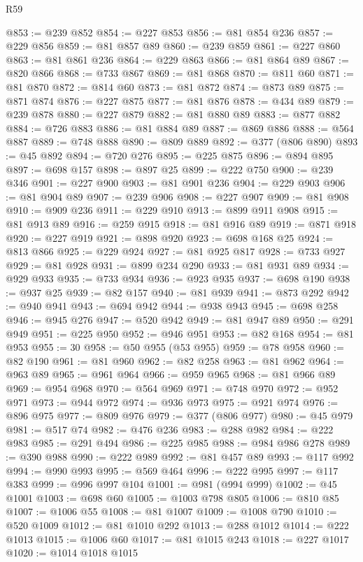 \begin{lexlean}{R59}
\begin{coremodule}
@853 := @239 @852
@854 := @227 @853
@856 := @81 @854 @236
@857 := @229 @856
@859 := @81 @857 @89
@860 := @239 @859
@861 := @227 @860
@863 := @81 @861 @236
@864 := @229 @863
@866 := @81 @864 @89
@867 := @820 @866
@868 := @733 @867
@869 := @81 @868
@870 := @811 @60
@871 := @81 @870
@872 := @814 @60
@873 := @81 @872
@874 := @873 @89
@875 := @871 @874
@876 := @227 @875
@877 := @81 @876
@878 := @434 @89
@879 := @239 @878
@880 := @227 @879
@882 := @81 @880 @89
@883 := @877 @882
@884 := @726 @883
@886 := @81 @884 @89
@887 := @869 @886
@888 := @564 @887
@889 := @748 @888
@890 := @809 @889
@892 := @377 (@806 @890)
@893 := @45 @892
@894 := @720 @276
@895 := @225 @875
@896 := @894 @895
@897 := @698 @157
@898 := @897 @25
@899 := @222 @750
@900 := @239 @346
@901 := @227 @900
@903 := @81 @901 @236
@904 := @229 @903
@906 := @81 @904 @89
@907 := @239 @906
@908 := @227 @907
@909 := @81 @908
@910 := @909 @236
@911 := @229 @910
@913 := @899 @911 @908
@915 := @81 @913 @89
@916 := @259 @915
@918 := @81 @916 @89
@919 := @871 @918
@920 := @227 @919
@921 := @898 @920
@923 := @698 @168 @25
@924 := @813 @866
@925 := @229 @924
@927 := @81 @925 @817
@928 := @733 @927
@929 := @81 @928
@931 := @899 @234 @290
@933 := @81 @931 @89
@934 := @929 @933
@935 := @733 @934
@936 := @923 @935
@937 := @698 @190
@938 := @937 @25
@939 := @82 @157
@940 := @81 @939
@941 := @873 @292
@942 := @940 @941
@943 := @694 @942
@944 := @938 @943
@945 := @698 @258
@946 := @945 @276
@947 := @520 @942
@949 := @81 @947 @89
@950 := @291 @949
@951 := @225 @950
@952 := @946 @951
@953 := @82 @168
@954 := @81 @953
@955 := 30
@958 := @50 @955 (@53 @955)
@959 := @78 @958
@960 := @82 @190
@961 := @81 @960
@962 := @82 @258
@963 := @81 @962
@964 := @963 @89
@965 := @961 @964
@966 := @959 @965
@968 := @81 @966 @89
@969 := @954 @968
@970 := @564 @969
@971 := @748 @970
@972 := @952 @971
@973 := @944 @972
@974 := @936 @973
@975 := @921 @974
@976 := @896 @975
@977 := @809 @976
@979 := @377 (@806 @977)
@980 := @45 @979
@981 := @517 @74
@982 := @476 @236
@983 := @288 @982
@984 := @222 @983
@985 := @291 @494
@986 := @225 @985
@988 := @984 @986 @278
@989 := @390 @988
@990 := @222 @989
@992 := @81 @457 @89
@993 := @117 @992
@994 := @990 @993
@995 := @569 @464
@996 := @222 @995
@997 := @117 @383
@999 := @996 @997 @104
@1001 := @981 (@994 @999)
@1002 := @45 @1001
@1003 := @698 @60
@1005 := @1003 @798 @805
@1006 := @810 @85
@1007 := @1006 @55
@1008 := @81 @1007
@1009 := @1008 @790
@1010 := @520 @1009
@1012 := @81 @1010 @292
@1013 := @288 @1012
@1014 := @222 @1013
@1015 := @1006 @60
@1017 := @81 @1015 @243
@1018 := @227 @1017
@1020 := @1014 @1018 @1015

\end{coremodule}
\end{lexlean}
